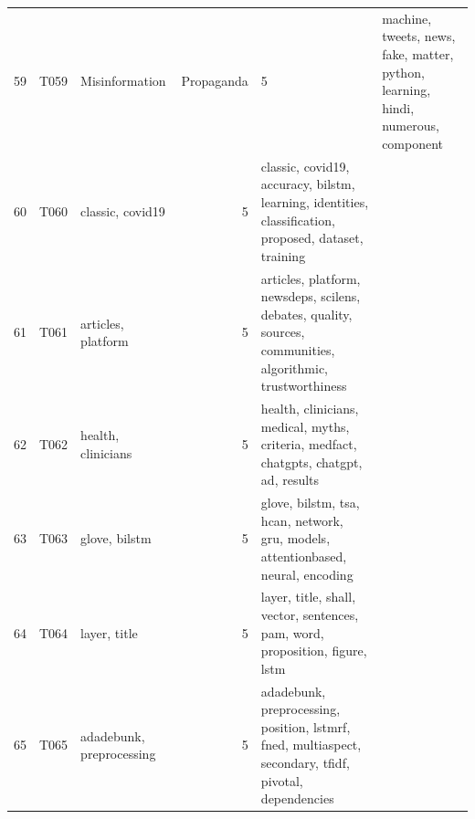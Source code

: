 \begin{tabular}{rllrl}
59 & T059 & Misinformation & Propaganda & 5 & machine, tweets, news, fake, matter, python, learning, hindi, numerous, component \\
60 & T060 & classic, covid19 & 5 & classic, covid19, accuracy, bilstm, learning, identities, classification, proposed, dataset, training \\
61 & T061 & articles, platform & 5 & articles, platform, newsdeps, scilens, debates, quality, sources, communities, algorithmic, trustworthiness \\
62 & T062 & health, clinicians & 5 & health, clinicians, medical, myths, criteria, medfact, chatgpts, chatgpt, ad, results \\
63 & T063 & glove, bilstm & 5 & glove, bilstm, tsa, hcan, network, gru, models, attentionbased, neural, encoding \\
64 & T064 & layer, title & 5 & layer, title, shall, vector, sentences, pam, word, proposition, figure, lstm \\
65 & T065 & adadebunk, preprocessing & 5 & adadebunk, preprocessing, position, lstmrf, fned, multiaspect, secondary, tfidf, pivotal, dependencies \\
\bottomrule
\end{tabular}
